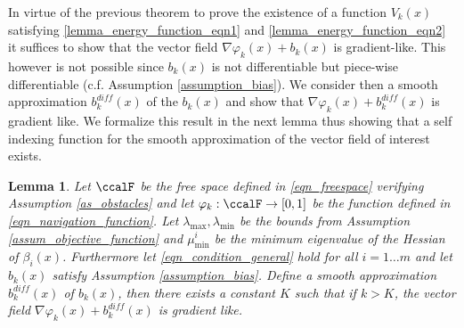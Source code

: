 \documentclass[article]{IEEEtran}
\newtheorem{lemma}{Lemma}
\theoremstyle{definition}
\begin{document}
%
In virtue of the previous theorem to prove the existence of a function $V_k(x)$ satisfying \eqref{lemma_energy_function_eqn1} and \eqref{lemma_energy_function_eqn2} it suffices to show that the vector field $\nabla \varphi_k(x)+b_k(x)$ is gradient-like. This however is not possible since $b_k(x)$ is not differentiable but piece-wise differentiable (c.f. Assumption \ref{assumption_bias}). We consider then a smooth approximation $b^{diff}_k(x)$ of the $b_k(x)$ and show that $\nabla \varphi_k(x)+b^{diff}_k(x)$ is gradient like. We formalize this result in the next lemma thus showing that a self indexing function for the smooth approximation of the vector field of interest exists. 
%
\begin{lemma}\label{lemma_gradient_like}
Let $\ccalF$ be the free space defined in \eqref{eqn_freespace} verifying Assumption \ref{as_obstacles} and let $\varphi_k:\ccalF\to[0,1]$ be the function defined in \eqref{eqn_navigation_function}. Let $\lambda_{\max}, \lambda_{\min}$ be the bounds from Assumption \ref{assum_objective_function} and $\mu_{\min}^i$ be the minimum eigenvalue of the Hessian of $\beta_i(x)$. Furthermore let \eqref{eqn_condition_general} hold for all $i=1\ldots m$ and let $b_k(x)$ satisfy Assumption \ref{assumption_bias}. Define a smooth approximation $b^{diff}_k(x)$ of $b_k(x)$, then there exists a constant $K$ such that if $k>K$, the vector field $\nabla \varphi_k(x)+b^{diff}_k(x)$ is gradient like.
\end{lemma}
%
\end{document}
